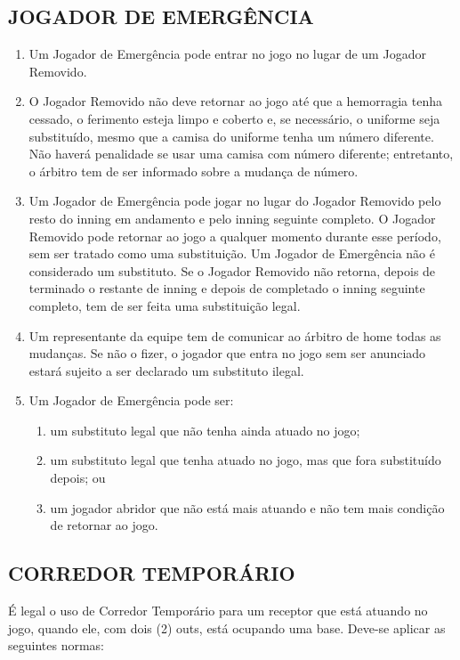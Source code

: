 \begin{multicols}{2}
	\subsection{JOGADOR DE EMERGÊNCIA} 
	
	\begin{enumerate}[label=\alph*)]
		\item Um Jogador de Emerg\^encia pode entrar no jogo no lugar de um Jogador Removido.	\item O Jogador Removido n\~ao deve retornar ao jogo at\'e que a hemorragia tenha cessado, o ferimento esteja limpo e coberto e, se necess\'ario, o uniforme seja substitu\'ido, mesmo que a camisa do uniforme tenha um n\'umero diferente. N\~ao haver\'a penalidade se usar uma camisa com n\'umero diferente; entretanto, o \'arbitro tem de ser informado sobre a mudan\c{c}a de n\'umero. 
		
		\item  Um Jogador de Emerg\^encia pode jogar no lugar do Jogador Removido pelo resto do \gls{inning} em andamento e pelo \gls{inning} seguinte completo. O Jogador Removido pode retornar ao jogo a qualquer momento durante esse per\'iodo, sem ser tratado como uma substitui\c{c}\~ao. Um Jogador de Emerg\^encia n\~ao \'e considerado um substituto. Se o Jogador Removido n\~ao retorna, depois de terminado o restante de \gls{inning} e depois de completado o \gls{inning} seguinte completo, tem de ser feita uma substitui\c{c}\~ao legal. 
		
		\item  Um representante da equipe tem de comunicar ao \'arbitro de \gls{home} todas as mudan\c{c}as. Se n\~ao o fizer, o jogador que entra no jogo sem ser anunciado estar\'a sujeito a ser declarado um substituto ilegal. 
		
		\item  Um Jogador de Emerg\^encia pode ser:
		\begin{enumerate}[label=\roman* -]
			\item um substituto legal que n\~ao tenha ainda atuado no jogo; 
			\item um substituto legal que tenha atuado no jogo, mas que fora substitu\'ido depois; ou 
			\item um jogador abridor que n\~ao est\'a mais atuando e n\~ao tem mais condi\c{c}\~ao de retornar ao jogo. 
		\end{enumerate}
	\end{enumerate}
	
	\subsection{CORREDOR TEMPOR\'ARIO}
	\'E legal o uso de Corredor Tempor\'ario para um receptor que est\'a atuando no jogo, quando ele, com dois (2) \glspl{out}, est\'a ocupando uma base. Deve-se aplicar as seguintes normas: 
	

\end{multicols}
